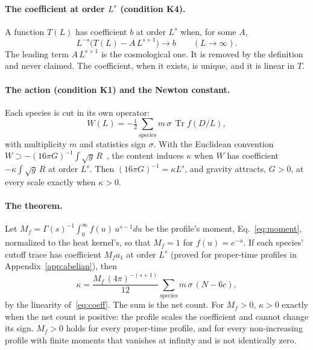 \documentclass[aps,prd,reprint,amsmath,amssymb,superscriptaddress,nofootinbib]{revtex4-2}
\begin{document}
\paragraph{The coefficient at order $L^s$ (condition K4).}
A function $T(L)$ has coefficient $b$ at order $L^s$ when, for some $A$,
\begin{equation}\label{eq:coeff}
  L^{-s}\bigl(T(L)-A\,L^{s+1}\bigr)\to b\qquad (L\to\infty).
\end{equation}
The leading term $A\,L^{s+1}$ is the cosmological one. It is removed by the definition
and never claimed. The coefficient, when it exists, is unique, and it is linear in $T$.

\paragraph{The action (condition K1) and the Newton constant.}
Each species is cut in its own operator:
\begin{equation}
  W(L)=-\tfrac12\sum_{\text{species}} m\,\sigma\,\operatorname{Tr} f(D/L),
\end{equation}
with multiplicity $m$ and statistics sign $\sigma$. With the Euclidean convention
$W\supset-(16\pi G)^{-1}\!\int\!\sqrt g\,R$~\cite{FrolovFursaevZelnikov1997}, the content
induces $\kappa$ when $W$ has coefficient $-\kappa\int\!\sqrt g\,R$ at order $L^s$. Then
$(16\pi G)^{-1}=\kappa L^s$, and gravity attracts, $G>0$, at every scale exactly when
$\kappa>0$.

\paragraph{The theorem.}
Let $M_f=\Gamma(s)^{-1}\int_0^\infty f(u)\,u^{s-1}du$ be the profile's moment, Eq.~\eqref{eq:moment},
normalized to the heat kernel's, so that $M_f=1$ for $f(u)=e^{-u}$. If each species' cutoff trace has
coefficient $M_f a_1$ at order $L^s$ (proved for proper-time profiles in
Appendix~\ref{app:abelian}), then
\begin{equation}\label{eq:kappa}
  \kappa=\frac{M_f\,(4\pi)^{-(s+1)}}{12}\sum_{\text{species}} m\,\sigma\,(N-6c),
\end{equation}
by the linearity of~\eqref{eq:coeff}. The sum is the net count. For $M_f>0$, $\kappa>0$
exactly when the net count is positive: the profile scales the coefficient and cannot
change its sign. $M_f>0$ holds for every proper-time profile, and for every non-increasing
profile with finite moments that vanishes at infinity and is not identically zero.
\end{document}
